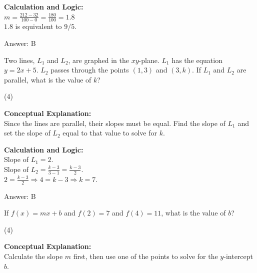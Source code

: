\documentclass[11pt,paper=a4,answers]{exam}
\begin{document}
\begin{questions}
\begin{solution}
\vspace{10pt}
\textbf{Calculation and Logic:} \\
$m = \frac{212 - 32}{100 - 0} = \frac{180}{100} = 1.8$ \\
$1.8$ is equivalent to $9/5$.

\vspace{15pt}
Answer: \colorbox{yellow!100}{B}
\end{solution}

\vspace{20pt}

\question
Two lines, $L_1$ and $L_2$, are graphed in the $xy$-plane. $L_1$ has the equation $y = 2x + 5$. $L_2$ passes through the points $(1, 3)$ and $(3, k)$. If $L_1$ and $L_2$ are parallel, what is the value of $k$?
\begin{tasks}(4)
\end{tasks}

\begin{solution}
\textbf{Conceptual Explanation:} \\
Since the lines are parallel, their slopes must be equal. Find the slope of $L_1$ and set the slope of $L_2$ equal to that value to solve for $k$.

\vspace{10pt}
\textbf{Calculation and Logic:} \\
Slope of $L_1 = 2$. \\
Slope of $L_2 = \frac{k - 3}{3 - 1} = \frac{k - 3}{2}$. \\
$2 = \frac{k - 3}{2} \Rightarrow 4 = k - 3 \Rightarrow k = 7$.

\vspace{15pt}
Answer: \colorbox{yellow!100}{B}
\end{solution}

\vspace{20pt}

\question
If $f(x) = mx + b$ and $f(2) = 7$ and $f(4) = 11$, what is the value of $b$?
\begin{tasks}(4)
\end{tasks}

\begin{solution}
\textbf{Conceptual Explanation:} \\
Calculate the slope $m$ first, then use one of the points to solve for the $y$-intercept $b$.


\end{solution}
\end{questions}
\end{document}
